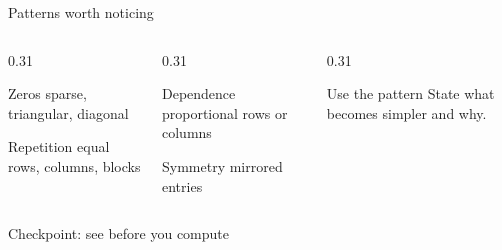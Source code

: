 \begin{frame}{Patterns worth noticing}
  \begin{columns}[T,onlytextwidth]
    \begin{column}{0.31\textwidth}
      \begin{block}{Zeros}
        sparse, triangular, diagonal
      \end{block}
      \begin{block}{Repetition}
        equal rows, columns, blocks
      \end{block}
    \end{column}
    \begin{column}{0.31\textwidth}
      \begin{exampleblock}{Dependence}
        proportional rows or columns
      \end{exampleblock}
      \begin{exampleblock}{Symmetry}
        mirrored entries
      \end{exampleblock}
    \end{column}
    \begin{column}{0.31\textwidth}
      \begin{alertblock}{Use the pattern}
        State what becomes simpler and why.
      \end{alertblock}
    \end{column}
  \end{columns}
\end{frame}

\begin{frame}{Checkpoint: see before you compute}
  \begin{center}
  \end{center}
  \vspace{0.7cm}
\end{frame}
